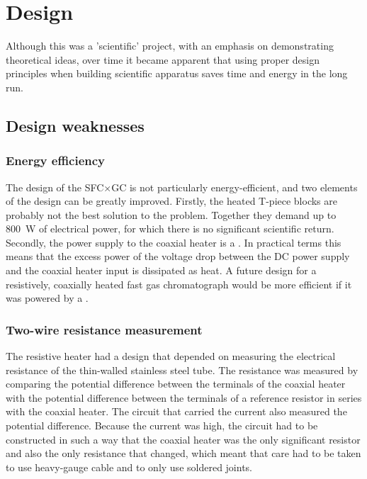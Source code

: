 \section{Design}

Although this was a 'scientific' project, with an emphasis on demonstrating
theoretical ideas, over time it became apparent that using proper design
principles when building scientific apparatus saves time and energy in the long
run.

\subsection{Design weaknesses}

\subsubsection{Energy efficiency}

The design of the SFC×GC is not particularly energy-efficient, and two elements
of the design can be greatly improved. Firstly, the heated T-piece blocks are
probably not the best solution to the problem. Together they demand up to
\SI{800}{\watt} of electrical power, for which there is no significant
scientific return. Secondly, the power supply to the coaxial heater is a
. In practical terms this means that the excess
power of the voltage drop between the DC power supply and the coaxial heater
input is dissipated as heat. A future design for a resistively, coaxially heated
fast gas chromatograph would be more efficient if it was powered by a
.

\subsubsection{Two-wire resistance measurement}

The resistive heater had a design that depended on measuring the electrical
resistance of the thin-walled stainless steel tube. The resistance was measured
by comparing the potential difference between the terminals of the coaxial
heater with the potential difference between the terminals of a reference
resistor in series with the coaxial heater. The circuit that carried the current
also measured the potential difference. Because the current was high, the
circuit had to be constructed in such a way that the coaxial heater was the only
significant resistor and also the only resistance that changed, which meant that
care had to be taken to use heavy-gauge cable and to only use soldered joints.

